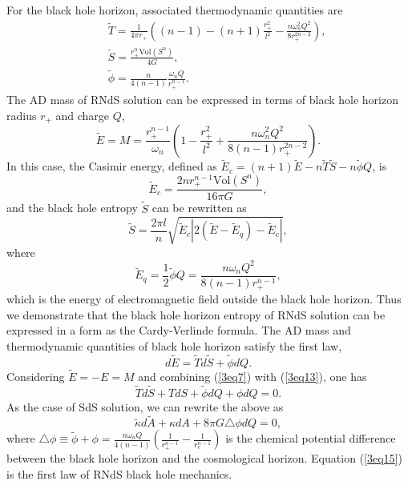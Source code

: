 \documentclass[a4paper,12pt]{article}
\begin{document}
For the black hole horizon, associated thermodynamic quantities are
\begin{eqnarray}
\label{3eq8}
&& \tilde T=\frac{1}{4\pi r_+}\left( (n-1) -(n+1)\frac{r_+^2}{l^2} -\frac{n\omega_n^2 Q^2}
   {8r_+^{2n-2}}\right), \nonumber \\
&& \tilde S=\frac{r_+^n \mbox{Vol}(S^n)}{4G}, \nonumber \\
&& \tilde \phi =\frac{n}{4(n-1)}\frac{\omega_n Q}{r_+^{n-1}}. 
\end{eqnarray}
The AD mass of RNdS solution can be expressed in terms of black hole horizon radius
$r_+$ and charge $Q$,
\begin{equation}
\label{3eq9}
\tilde E =M =\frac{r_+^{n-1}}{\omega_n} \left (1-\frac{r_+^2}{l^2} +
   \frac{n\omega_n^2 Q^2}{8(n-1)r_+^{2n-2}}\right).
\end{equation}
In this case, the Casimir energy, defined as $\tilde E_c =(n+1)\tilde E -n\tilde T\tilde
 S-n\tilde \phi Q$, is 
\begin{equation}
\label{3eq10}
\tilde E_c =\frac{2n r_+^{n-1}\mbox{Vol}(S^n)}{16\pi G},
\end{equation}
and the black hole entropy $\tilde S$ can be rewritten as
\begin{equation}
\label{3eq11}
\tilde S =\frac{2\pi l}{n}\sqrt{\tilde E_c |2(\tilde E-\tilde E_q)-\tilde E_c|},
\end{equation}
where 
\begin{equation}
\tilde E_q =\frac{1}{2}\tilde \phi Q=\frac{n\omega_n Q^2}{8(n-1)r_+^{n-1}},
\end{equation}
which is the energy of electromagnetic field outside the black hole horizon. Thus
we demonstrate that the black hole horizon entropy of RNdS solution can be expressed 
in a form as the Cardy-Verlinde formula. The AD mass and thermodynamic quantities of black hole
horizon satisfy the first law,
\begin{equation}
\label{3eq13}
d\tilde E =\tilde Td\tilde S +\tilde \phi dQ.
\end{equation}
Considering $\tilde E =-E =M$ and combining (\ref{3eq7}) with (\ref{3eq13}),
one has 
\begin{equation}
\label{3eq14}
\tilde Td\tilde S +TdS +\tilde \phi dQ +\phi dQ=0.
\end{equation}
As the case of SdS solution, we can rewrite the above as
\begin{equation}
\label{3eq15} 
\tilde \kappa d\tilde A +\kappa dA +8\pi G \triangle \phi dQ=0,
\end{equation}
where $\triangle\phi \equiv \tilde \phi +\phi=\frac{n\omega_nQ}{4(n-1)}
\left(\frac{1}{r_+^{n-1}}-\frac{1}{r_c^{n-1}} \right) $ is the chemical potential difference
between the black hole horizon and the cosmological horizon. Equation (\ref{3eq15}) is the
first law of RNdS black hole mechanics.
\end{document}
